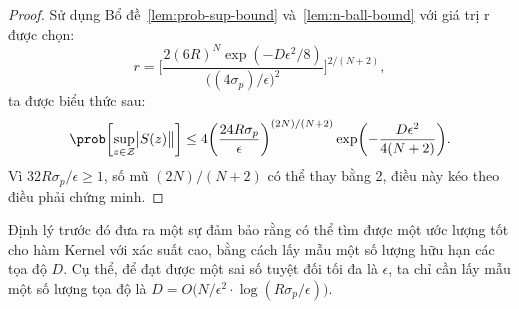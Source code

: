 \begin{proof}
  Sử dụng Bổ đề~\ref{lem:prob-sup-bound} và~\ref{lem:n-ball-bound} với giá trị
  r được chọn: \begin{equation}
    r = \Biggl[ \frac{2(6R)^N \exp(-D\epsilon^2 / 8)}{ \bigl((4\sigma_p) /
    \epsilon \bigr)^2 } \Biggr ]^{2/(N + 2)},
  \end{equation}ta được biểu thức sau: \begin{equation}
    \prob\biggl[ \sup_{z \in \mathcal{Z}} \bigl\lvert S(z) \bigr\rVert \biggr ]
    \le 4\biggl( \frac{ 24R\sigma_p } { \epsilon } \biggr ) ^{(2N) / (N + 2)}
    \exp\biggl( - \frac{D\epsilon^2} { 4(N + 2) } \biggr ).
  \end{equation} Vì $32R\sigma_p / \epsilon \ge 1$, số mũ $(2N) / (N + 2)$ có
  thể thay bằng 2, điều này kéo theo điều phải chứng minh.
\end{proof}

Định lý trước đó đưa ra một sự đảm bảo rằng có thể tìm được một ước lượng tốt
cho hàm Kernel với xác suất cao, bằng cách lấy mẫu một số lượng hữu hạn các tọa
độ $D$. Cụ thể, để đạt được một sai số tuyệt đối tối đa là $\epsilon$, ta chỉ
cần lấy mẫu một số lượng tọa độ là $D = O\bigl( N/\epsilon^2 \cdot \log(
R\sigma_p / \epsilon ) \bigr)$.
